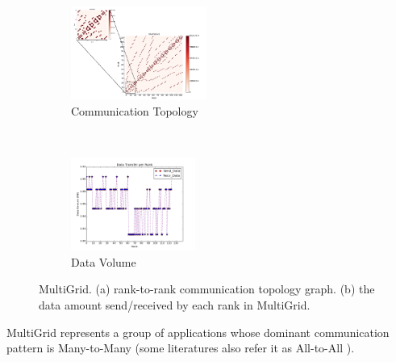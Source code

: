 \documentclass[conference]{IEEEtran}
\begin{document}
\begin{figure}[t!]
    \centering
    \begin{subfigure}[t]{0.22\textwidth}
        \centering
        \includegraphics[height=1.2in]{figs/appstudy/mg/mg_pip}
        \caption{Communication Topology}
        \label{fig: mg communication topology}
    \end{subfigure}
    ~
    \begin{subfigure}[t]{0.22\textwidth}
        \centering
        \includegraphics[height=1.2in]{figs/appstudy/mg/mg_data_transfer}
        \caption{Data Volume}
        \label{fig: mg data trans}
    \end{subfigure}
    \caption{MultiGrid. (a) rank-to-rank communication topology graph. (b) the data amount send/received by each rank in MultiGrid.}
\end{figure}


MultiGrid represents a group of applications whose dominant communication pattern is Many-to-Many (some literatures also refer it as All-to-All \cite{hpdc2015-ornl}).  
\end{document}
